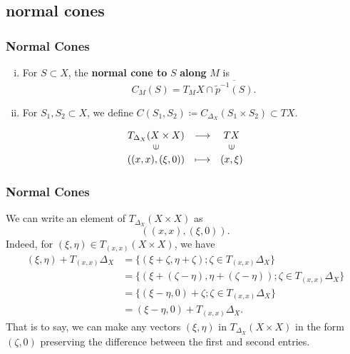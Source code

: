 \documentclass[dvipdfmx,12pt,aspectratio=169,leqno]{beamer}%
\renewcommand{\emph}[1]{{\upshape\bfseries #1}}
\numberwithin{equation}{subsection}
\theoremstyle{mystyle}
\begin{document}
\subsection{normal cones}
\begin{frame}
    \frametitle{Normal Cones}
    \begin{definition}[{\cite[Def.4.1.1]{KS90}}]
        \begin{enumerate}[(i)]
            \item For \(S\subset X\), the \emph{normal cone to} \(S\) \emph{along} \(M\) is\[
                C_{M}(S)=T_{M}X\cap\overline{\widetilde{p}^{-1}(S)}.
            \]
            \item For \(S_1, S_2\subset X\), 
            we define \(C(S_1,S_2)\coloneqq C_{\Delta_{X}}(S_1\times S_2)\subset TX\).
        \end{enumerate}
        \[
            \begin{array}{ccc}
                T_{\Delta_X}(X\times X)&\longrightarrow&TX\\
                \rotatebox{90}{$\in$}&&\rotatebox{90}{$\in$}\\
                \left((x,x),(\xi,0)\right)&\longmapsto&\left(x, \xi\right)        
            \end{array}
        \]    
    \end{definition}
\end{frame}

\begin{frame}
    \frametitle{Normal Cones}

    We can write an element of \(T_{\Delta_X}(X\times X)\) as
    \[
        \left((x,x),(\xi,0)\right).
    \]
    Indeed, for \((\xi,\eta) \in T_{(x,x)}(X\times X)\), 
    we have
    \begin{align*}
        (\xi,\eta) + T_{(x,x)}\Delta_X
        &=\{(\xi+\zeta,\eta+\zeta);\zeta\in T_{(x,x)}\Delta_X\}\\
        &=\{(\xi+(\zeta-\eta),\eta+(\zeta-\eta));\zeta\in T_{(x,x)}\Delta_X\}\\
        &=\{(\xi-\eta,0)+\zeta;\zeta\in T_{(x,x)}\Delta_X\}\\
        &=(\xi-\eta,0)+ T_{(x,x)}\Delta_X.
    \end{align*}
    That is to say, we can make any vectors \(
        (\xi,\eta)
    \) in \(T_{\Delta_X}(X\times X)\) in the form \(
        (\zeta,0)
    \) preserving the difference between the first and second entries.
\end{frame}
\end{document}
